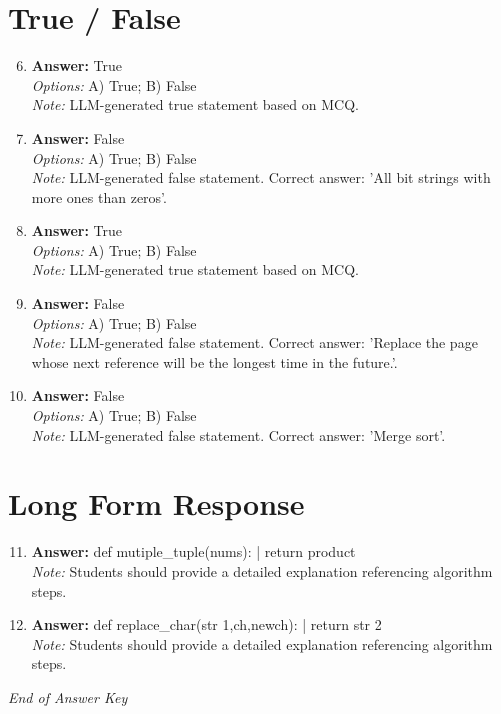 \documentclass[12pt]{article}
\begin{document}
\section*{True / False}
\begin{enumerate}[label=\arabic*.]
\setcounter{enumi}{5}
\item \textbf{Answer:} True
\\ \textit{Options:} A) True; B) False
\\ \textit{Note:} LLM-generated true statement based on MCQ.
\item \textbf{Answer:} False
\\ \textit{Options:} A) True; B) False
\\ \textit{Note:} LLM-generated false statement. Correct answer: 'All bit strings with more ones than zeros'.
\item \textbf{Answer:} True
\\ \textit{Options:} A) True; B) False
\\ \textit{Note:} LLM-generated true statement based on MCQ.
\item \textbf{Answer:} False
\\ \textit{Options:} A) True; B) False
\\ \textit{Note:} LLM-generated false statement. Correct answer: 'Replace the page whose next reference will be the longest time in the future.'.
\item \textbf{Answer:} False
\\ \textit{Options:} A) True; B) False
\\ \textit{Note:} LLM-generated false statement. Correct answer: 'Merge sort'.
\end{enumerate}

\section*{Long Form Response}
\begin{enumerate}[label=\arabic*.]
\setcounter{enumi}{10}
\item \textbf{Answer:} def mutiple\_tuple(nums): | return product
\\ \textit{Note:} Students should provide a detailed explanation referencing algorithm steps.
\item \textbf{Answer:} def replace\_char(str 1,ch,newch): | return str 2
\\ \textit{Note:} Students should provide a detailed explanation referencing algorithm steps.
\end{enumerate}

\vfill
\noindent\textit{End of Answer Key}
\end{document}
